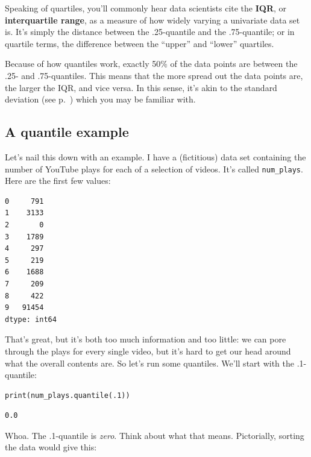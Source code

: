 
Speaking of quartiles, you'll commonly hear data scientists cite the
\textbf{IQR}, or \textbf{interquartile range}, as a measure of how widely
varying a univariate data set is. It's simply the distance between the
.25-quantile and the .75-quantile; or in quartile terms, the difference between
the ``upper'' and ``lower'' quartiles.

Because of how quantiles work, exactly 50\% of the data points are between the
.25- and .75-quantiles. This means that the more spread out the data points
are, the larger the IQR, and vice versa. In this sense, it's akin to the
standard deviation (see p.~\pageref{standardDeviation}) which you may be
familiar with.

\subsection{A quantile example}


Let's nail this down with an example. I have a (fictitious) data set containing
the number of YouTube plays for each of a selection of videos. It's called
\texttt{num\_plays}. Here are the first few values:

\begin{Verbatim}[fontsize=\small,samepage=true,frame=leftline,framesep=5mm,framerule=1mm]
0     791
1    3133
2       0
3    1789
4     297
5     219
6    1688
7     209
8     422
9   91454
dtype: int64
\end{Verbatim}

That's great, but it's both too much information and too little: we can pore
through the plays for every single video, but it's hard to get our head around
what the overall contents are. So let's run some quantiles. We'll start with
the .1-quantile:

\begin{Verbatim}[fontsize=\small,samepage=true,frame=single,framesep=3mm]
print(num_plays.quantile(.1))
\end{Verbatim}
\vspace{-.3in}

\begin{Verbatim}[fontsize=\small,samepage=true,frame=leftline,framesep=5mm,framerule=1mm]
0.0
\end{Verbatim}

\label{pointOneQuantileEpiphany}
Whoa. The .1-quantile is \textit{zero}. Think about what that means.
Pictorially, sorting the data would give this:

